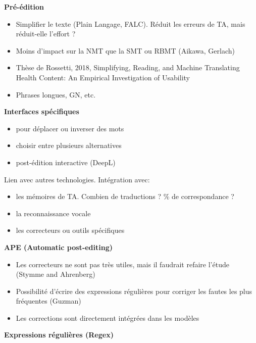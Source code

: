 \textbf{Pré-édition}

\begin{itemize}
    \item Simplifier le texte (Plain Langage, FALC). Réduit les erreurs de TA, mais réduit-elle l'effort ?
    \item Moins d'impact sur la NMT que la SMT ou RBMT (Aikawa, Gerlach)
    \item Thèse de Rossetti, 2018, Simplifying, Reading, and Machine Translating Health Content: An Empirical Investigation of Usability
    \item Phrases longues, GN, etc.\\
\end{itemize}

\textbf{Interfaces spécifiques}

\begin{itemize}
    \item pour déplacer ou inverser des mots
    \item choisir entre plusieurs alternatives
    \item post-édition interactive (DeepL)\\
\end{itemize}

Lien avec autres technologies. Intégration avec:

\begin{itemize}
    \item les mémoires de TA. Combien de traductions ? \% de correspondance ?
    \item la reconnaissance vocale
    \item les correcteurs ou outils spécifiques\\
\end{itemize}

\textbf{APE (Automatic post-editing)}

\begin{itemize}
    \item Les correcteurs ne sont pas très utiles, mais il faudrait refaire l'étude (Stymme and Ahrenberg)
    \item Possibilité d'écrire des expressions régulières pour corriger les fautes les plus fréquentes (Guzman)
    \item Les corrections sont directement intégrées dans les modèles\\
\end{itemize}

\textbf{Expressions régulières (Regex)}

